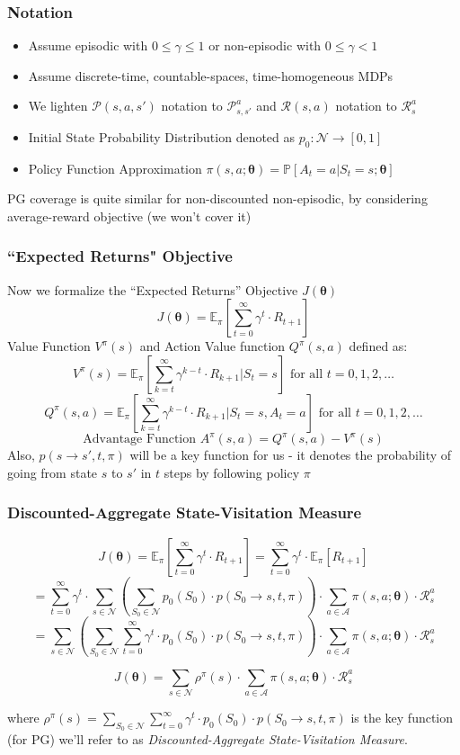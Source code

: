 \documentclass[handout]{beamer}
\begin{document}
\begin{frame}
\frametitle{Notation}
\pause
\begin{itemize}[<+->]
\item Assume episodic with $0 \leq \gamma \leq1$ or non-episodic with $0 \leq \gamma < 1$
\item Assume discrete-time, countable-spaces, time-homogeneous MDPs
\item We lighten $\mathcal{P}(s,a,s')$ notation to $\mathcal{P}_{s,s'}^a$ and $\mathcal{R}(s,a)$ notation to $\mathcal{R}_s^a$
\item Initial State Probability Distribution denoted as $p_0 : \mathcal{N} \rightarrow [0,1]$
\item Policy Function Approximation $\pi(s,a;\bm{\theta}) = \mathbb{P}[A_t=a | S_t=s; \bm{\theta}]$
\end{itemize}
\pause
PG coverage is quite similar for non-discounted non-episodic, by considering average-reward objective (we won't cover it)
\end{frame}

\begin{frame}
\frametitle{``Expected Returns" Objective}
\pause
Now we formalize the ``Expected Returns'' Objective $J(\bm{\theta})$
$$J(\bm{\theta}) = \mathbb{E}_{\pi}[\sum_{t=0}^\infty \gamma^t \cdot R_{t+1}]$$
\pause
Value Function $V^{\pi}(s)$ and Action Value function $Q^{\pi}(s,a)$ defined as:
$$V^{\pi}(s) = \mathbb{E}_{\pi}[\sum_{k=t}^\infty \gamma^{k-t} \cdot R_{k+1} | S_t=s] \text{ for all } t = 0, 1, 2, \ldots$$
$$Q^{\pi}(s,a) = \mathbb{E}_{\pi}[\sum_{k=t}^\infty \gamma^{k-t} \cdot R_{k+1} | S_t=s, A_t=a] \text{ for all } t = 0, 1, 2, \ldots$$
\pause
$$\mbox{Advantage Function } A^{\pi}(s,a) = Q^{\pi}(s,a) - V^{\pi}(s)$$
\pause
Also, $p(s \rightarrow s', t, \pi)$ will be a key function for us - it denotes the probability of going from state $s$ to $s'$ in $t$ steps by following policy $\pi$
\end{frame}

\begin{frame}
\frametitle{Discounted-Aggregate State-Visitation Measure}
\pause
$$J(\bm{\theta}) = \mathbb{E}_{\pi}[\sum_{t=0}^\infty \gamma^t \cdot R_{t+1}] = \sum_{t=0}^\infty \gamma^t \cdot \mathbb{E}_{\pi}[R_{t+1}]$$
\pause
$$ = \sum_{t=0}^\infty \gamma^t \cdot \sum_{s \in \mathcal{N}} (\sum_{S_0 \in \mathcal{N}}  p_0(S_0) \cdot p(S_0 \rightarrow s, t, \pi)) \cdot \sum_{a \in \mathcal{A}} \pi(s,a; \bm{\theta}) \cdot \mathcal{R}_s^a$$
\pause
$$ =  \sum_{s \in \mathcal{N}} (\sum_{S_0 \in \mathcal{N}}  \sum_{t=0}^\infty \gamma^t \cdot p_0(S_0) \cdot p(S_0 \rightarrow s, t, \pi)) \cdot \sum_{a \in \mathcal{A}} \pi(s,a; \bm{\theta}) \cdot \mathcal{R}_s^a$$
\pause
\begin{definition}
$$J(\bm{\theta}) =  \sum_{s \in \mathcal{N}} \rho^{\pi}(s) \cdot \sum_{a \in \mathcal{A}} \pi(s,a; \bm{\theta}) \cdot \mathcal{R}_s^a$$
\end{definition}
\pause
where $\rho^{\pi}(s) = \sum_{S_0 \in \mathcal{N}}  \sum_{t=0}^\infty \gamma^t \cdot p_0(S_0) \cdot p(S_0 \rightarrow s, t, \pi)$ is the key function (for PG) we'll refer to as {\em Discounted-Aggregate State-Visitation Measure}.
\end{frame}
\end{document}
